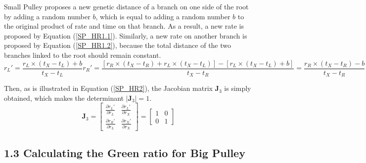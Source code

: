 \documentclass{bmcart}
\begin{document}
\begin{backmatter}
Small Pulley proposes a new genetic distance of a branch on one side of the root by adding a random number $b$, which is equal to adding a random number $b$ to the original product of rate and time on that branch. As a result, a new rate is proposed by Equation (\ref{SP_HR1.1}). Similarly, a new rate on another branch is proposed by Equation (\ref{SP_HR1.2}), because the total distance of the two branches linked to the root should remain constant.
\begin{subequations}\label{SP_HR1}
\begin{equation}\label{SP_HR1.1}
{r_L}' = \frac{{{r_L} \times ({t_X} - {t_L}) + b}}{{{t_X} - {t_L}}}
\end{equation}
\begin{equation}\label{SP_HR1.2}
{r_R}' = \frac{{[{r_R} \times ({t_X} - {t_R}) + {r_L} \times ({t_X} - {t_L})] - [{r_L} \times ({t_X} - {t_L}) + b]}}{{{t_X} - {t_R}}} = \frac{{{r_R} \times ({t_X} - {t_R}) - b}}{{{t_X} - {t_R}}}
\end{equation}
\end{subequations}

Then, as is illustrated in Equation (\ref{SP_HR2}), the Jacobian matrix ${{\mathbf{J}}_3}$ is simply obtained, which makes the determinant $\left| {{{\mathbf{J}}_3}} \right| = 1$.
\begin{equation}\label{SP_HR2}
{{\mathbf{J}}_3} = \left[ {\begin{array}{*{20}{c}}
  {\frac{{\partial {r_L}'}}{{\partial {r_L}}}}&{\frac{{\partial {r_L}'}}{{\partial {r_X}}}} \\
  {\frac{{\partial {r_R}'}}{{\partial {r_L}}}}&{\frac{{\partial {r_X}'}}{{\partial {r_X}}}}
\end{array}} \right] = \left[ {\begin{array}{*{20}{c}}
  1&0 \\
  0&1
\end{array}} \right]
\end{equation}
\subsection*{1.3 Calculating the Green ratio for Big Pulley}


\end{backmatter}
\end{document}
